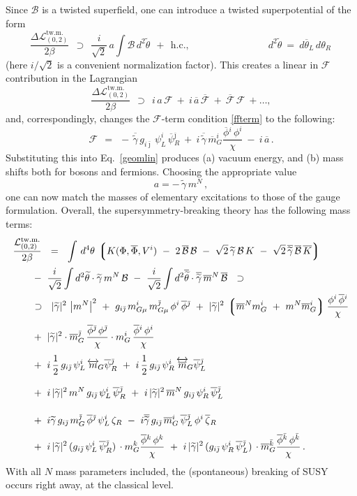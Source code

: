 \documentclass[12pt]{article}
\newcommand{\wt}{\widetilde}
\newcommand{\ov}{\overline}
\newcommand{\mc}[1]{\mathcal{#1}}
\newcommand{\lgr}{\left\lgroup}
\newcommand{\rgr}{\right\rgroup}
\newcommand{\bzr}{\ov{\zeta}{}_R}
\newcommand{\zr}{\zeta_R}
\newcommand{\tgamma}{\wt{\gamma}}
\newcommand{\btgamma}{\ov{\tgamma}}
\newcommand{\bpsi}{\ov{\psi}{}}
\newcommand{\bphi}{\ov{\phi}{}}
\newcommand{\ff}{\mc{F}}
\newcommand{\bff}{\ov{\mc{F}}}
\newcommand{\bj}{{\bar \jmath}}
\newcommand{\bk}{{\bar k}}
\begin{document}
	Since $ \mc{B} $ is a twisted superfield, one can introduce a twisted superpotential of the form
\[
	\frac{\Delta\mc{L}^\text{tw.m.}_{(0,2)}}{2\beta} ~~\supset~~
	\frac{i}{\sqrt{2}}\,a \int \mc{B}\, d^2\wt{\theta} ~~+~~ \text{h.c.},
	\qquad\qquad\qquad\qquad d^2\wt{\theta} ~=~ d\ov{\theta}{}_L\,d\theta_R\,
\]
	(here $ i/\sqrt{2} $ is a convenient normalization factor).
	This creates a linear in $ \ff $ contribution in the Lagrangian
\[
	\frac{\Delta\mc{L}_{(0,2)}^\text{tw.m.}}
             {2\beta} ~~\supset~~ i\,a\,\ff ~+~ i\,\ov{a}\,\bff ~+~ \bff\,\ff ~+ \dots,
\]
	and, correspondingly, changes the $ \ff $-term condition \eqref{ffterm} to the following:
\[
	\ff ~~=~~ -\, \btgamma\, g_{i\bj}\, \psi_L^i\, \bpsi_R^\bj 
		~+~ i\, \btgamma\, \ov{m}_G^i \frac{\bphi^i\, \phi^i}{\chi}
		~-~ i\, \ov{a}\,.
\]
	Substituting this into Eq.~\eqref{geomlin} produces (a) vacuum energy, and (b) mass shifts both for
	bosons and fermions.
	Choosing the appropriate value 
$$ a = -\, \tgamma\,m^N \,,$$ 
	one can now match the masses of elementary excitations  to those of the gauge formulation.
	Overall, the supersymmetry-breaking theory has the following mass terms:
\begin{align}
%
\notag
	\frac{\mc{L}_{(0,2)}^\text{tw.m.}}{2\beta} & 
	~~=~~ \int\, d^4\theta\, \lgr K(\Phi,\ov{\Phi}, V^i) 
		~-~ 2\, \ov{\mc{B}}\,\mc{B}  
		~-~  \sqrt{2}\, \tgamma\,\mc{B}\,K  ~-~ \sqrt{2}\, \ov{\tgamma}\,\ov{\mc{B}}\,\ov{K} \rgr
	\\[0.5mm]
%
\notag
	&\!\!\!\!\!\!\!\!
	~-~ \frac{i}{\sqrt{2}} \int d^2\wt{\theta} \cdot \tgamma\,m^N\,\mc{B} 
	~-~ \frac{i}{\sqrt{2}} \int d^2\ov{\wt{\theta}} \cdot \btgamma\, \ov{m}{}^N\, \ov{\mc{B}}
	~~\supset~~
	\\
%
\notag
	&\!\!\!\!\!\!\!\!
	~\supset~~
	|\tgamma|^2\, \left|m^N\right|^2 
	~+~ g_{i\bj}\, m_{G\mu}^i\, m_{G\mu}^\bj\, \phi^i\, \bphi^\bj
	~+~ |\tgamma|^2\, \lgr \ov{m}{}^N m_G^i ~+~ m^N \ov{m}{}_G^i \rgr \frac {\phi^i\,\bphi^i}{\chi}
	\\[1mm]
%
\label{geom_mass}
	&\!\!\!\!\!\!\!\!
	~+~ |\tgamma|^2 \cdot \ov{m}{}_G^\bj\,\frac{\bphi^\bj\,\phi^\bj}{\chi}
			\cdot m_G^i\, \frac{\bphi^i\, \phi^i}{\chi}
	\\[1mm]
%
\notag
	&\!\!\!\!\!\!\!\!
	~+~ i\,\frac{1}{2}\,g_{i\bj}\,\psi_L^i\, \overleftrightarrow{m}{}_{\!G} \bpsi_R^\bj
	~+~ i\,\frac{1}{2}\,g_{i\bj}\,\psi_R^i\, \overleftrightarrow{\ov{m}}{}_{\!G} \bpsi_L^\bj
	\\[3mm]
%
\notag
	&\!\!\!\!\!\!\!\!
	~+~ i\,|\tgamma|^2\,m^N\,g_{i\bj}\,\psi_L^i\, \bpsi_R^\bj
	~+~ i\,|\tgamma|^2\,\ov{m}{}^N\,g_{i\bj}\,\psi_R^i\, \bpsi_L^\bj
	\\[4mm]
%
\notag
	&\!\!\!\!\!\!\!\!
	~+~ i\tgamma\, g_{i\bj}\, m_G^\bj\,\bphi^\bj\, \psi_L^i\,\zr
	~-~ i\btgamma\, g_{i\bj}\,\ov{m}{}_G^i\, \bpsi_L^\bj\, \phi^i\,\bzr
	\\[1mm]
%
\notag
	&\!\!\!\!\!\!\!\!
	~+~ i\, |\tgamma|^2\, (g_{i\bj}\,\psi_L^i\,\bpsi_R^\bj)\, \cdot m_G^k \frac{\bphi^k\, \phi^k}{\chi}
	~+~ i\, |\tgamma|^2\, (g_{i\bj}\,\psi_R^i\,\bpsi_L^\bj)\, \cdot \ov{m}{}_G^\bk \frac{\bphi^\bk\,\phi^\bk}{\chi}
	\,.
\end{align}
With all $N$ mass parameters included, the (spontaneous) breaking of SUSY occurs right away, 
at the classical level.
\end{document}
